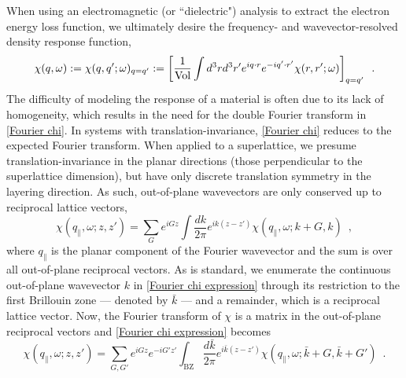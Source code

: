 \documentclass{article}
\begin{document}
When using an electromagnetic (or ``dielectric") analysis to extract the electron energy loss function, we ultimately desire the frequency- and wavevector-resolved density response function,
\begin{equation}
    \label{Fourier chi}
    \chi(q,\omega):=\chi(q,q';\omega)_{q=q'}
    :=
    \left[\frac{1}{\text{Vol}}\int d^3 r d^3 r' e^{iq\cdot r} e^{-i q'\cdot r'}\chi(r,r';\omega)\right]_{q=q'}
    \,\,\,.
\end{equation}
The difficulty of modeling the response of a material is often due to its lack of homogeneity, which results in the need for the double Fourier transform in \eqref{Fourier chi}.  In systems with translation-invariance, \eqref{Fourier chi} reduces to the expected Fourier transform.  When applied to a superlattice, we presume translation-invariance in the planar directions (those perpendicular to the superlattice dimension), but have only discrete translation symmetry in the layering direction.  As such, out-of-plane wavevectors are only conserved up to reciprocal lattice vectors,
\begin{equation}
    \label{Fourier chi expression}
    \chi(q_\parallel,\omega;z,z') = \sum_G e^{iG z} \int \frac{dk}{2\pi} e^{ik(z-z')}\chi(q_\parallel,\omega;k+G,k)
    \,\,\,,
\end{equation}
where $q_\parallel$ is the planar component of the Fourier wavevector and the sum is over all out-of-plane reciprocal vectors.  As is standard, we enumerate the continuous out-of-plane wavevector $k$ in \eqref{Fourier chi expression} through its restriction to the first Brillouin zone --- denoted by $\bar k$ --- and a remainder, which is a reciprocal lattice vector.  Now, the Fourier transform of $\chi$ is a matrix in the out-of-plane reciprocal vectors and \eqref{Fourier chi expression} becomes
\begin{equation}
    \label{Fourier chi G matrix}
    \chi(q_\parallel,\omega;z,z') = \sum_{G,G'} e^{iG z} e^{-i G' z'} \int_\text{BZ} \frac{d\bar k}{2\pi} e^{i\bar k(z-z')}\chi(q_\parallel,\omega;\bar k+G,\bar k+G')
    \,\,\,.
\end{equation}
\end{document}
